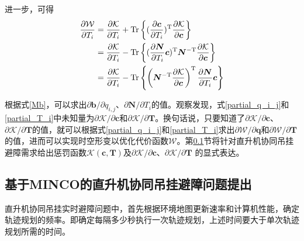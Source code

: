 进一步，可得
\begin{equation}
\begin{aligned}\label{partial_T_i}
    \frac{\partial \mathcal{W}}{\partial T_i} &= \frac{\partial \mathcal{K}}{\partial T_i} + {\rm{Tr}}\left\{
    (\frac{\partial\boldsymbol{c}}{\partial T_i})^{\rm{T}}\frac{\partial\mathcal{K}}{\partial \boldsymbol{c}}
    \right\}\\
    &= \frac{\partial\mathcal{K}}{\partial T_i} - {\rm{Tr}}\left\{
    (\frac{\partial \boldsymbol{N}}{\partial T_i}\boldsymbol{c})^{\rm{T}}\boldsymbol{N}^{\rm{-T}} \frac{\partial \mathcal{K}}{\partial \boldsymbol{c}}
    \right\}\\
    &= \frac{\partial \mathcal{K}}{\partial T_i} - {\rm{Tr}}\left\{
    \left( \boldsymbol{N}^{\rm{-T}}\frac{\partial \mathcal{K}}{\partial \boldsymbol{c}} \right)^{\rm{T}}\frac{\partial \boldsymbol{N}}{\partial T_i}\boldsymbol{c}
    \right\}
\end{aligned}
\end{equation}

根据式\ref{Mb}，可以求出$\partial\boldsymbol{b}/\partial q_{i,j}$、$\partial\boldsymbol{N}/\partial T_i$的值。观察发现，式\ref{partial_q_i_j}和\ref{partial_T_i}中未知量为${\partial\mathcal{K}}/{\partial\boldsymbol{c}}$和${\partial\mathcal{K}}/{\partial\boldsymbol{T}}$。换句话说，只要知道了$\partial\mathcal{K}/{\partial\boldsymbol{c}}$、${\partial\mathcal{K}}/{\partial\boldsymbol{T}}$的值，就可以根据式\ref{partial_q_i_j}和\ref{partial_T_i}求出$\partial\mathcal{W}/\partial\boldsymbol{q}$和$\partial\mathcal{W}/\partial\boldsymbol{T}$的值，进而可以实现时空形变以优化代价函数$\mathcal{W}$。第\ref{problem_formulate}节将针对直升机协同吊挂避障需求给出惩罚函数$\mathcal{K}(\boldsymbol{c}, \boldsymbol{T})$及$\partial\mathcal{K}/{\partial\boldsymbol{c}}$、${\partial\mathcal{K}}/{\partial\boldsymbol{T}}$
的显式表达。

\subsection{基于MINCO的直升机协同吊挂避障问题提出}\label{problem_formulate}
直升机协同吊挂实时避障问题中，首先根据环境地图更新速率和计算机性能，确定轨迹规划的频率。即确定每隔多少秒执行一次轨迹规划，上述时间要大于单次轨迹规划所需的时间。

